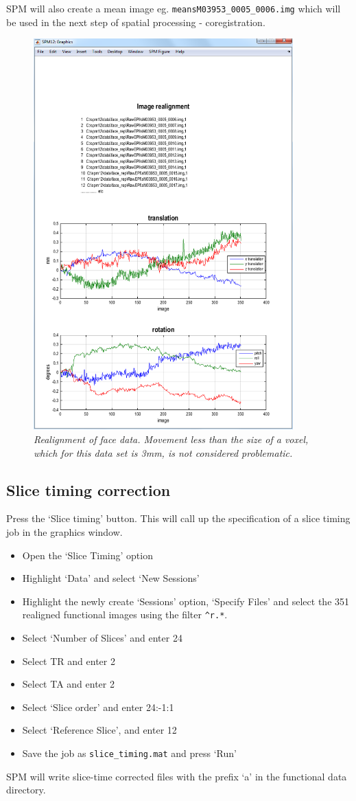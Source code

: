 \documentclass[a4paper,titlepage]{book}
\newcommand{\bi}{\begin{itemize}}
\newcommand{\ei}{\end{itemize}}
\begin{document}
SPM will also create a mean image eg. 
\verb!meansM03953_0005_0006.img! which will be used in the next
step of spatial processing - coregistration.
\begin{figure}
\begin{center}
\includegraphics[width=100mm]{realign}
\caption{\em Realignment of face data. Movement less than the size of a voxel, which for this data set is 3mm, is not considered problematic. \label{face_realign}}
\end{center}
\end{figure}

\subsection{Slice timing correction}

Press the `Slice timing' button. This will call up the specification of a slice timing job in the graphics 
window. 
\bi
\item{Open the `Slice Timing' option}
\item{Highlight `Data' and select `New Sessions'}
\item{Highlight the newly create `Sessions' option, `Specify Files' and select the
351 realigned functional images using the 
filter \verb!^r.*!.}
\item{Select `Number of Slices' and enter 24}
\item{Select TR and enter 2}
\item{Select TA and enter 2}
\item{Select `Slice order' and enter 24:-1:1}
\item{Select `Reference Slice', and enter 12}
\item{Save the job as \verb!slice_timing.mat! and press `Run'}
\ei
SPM will write slice-time corrected files with 
the prefix `a' in the functional data directory.
\end{document}
